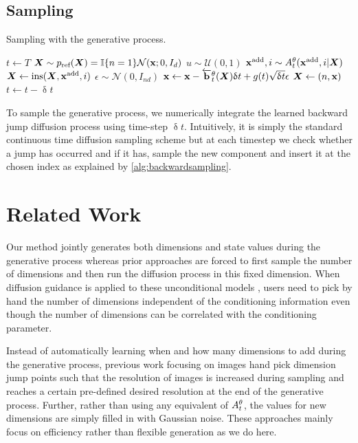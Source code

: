 \subsection{Sampling}

\begin{algorithm}
\caption{Sampling with the generative process.}
\begin{algorithmic}[1] %
\State $t \leftarrow T$
\State ${\bm{X}} \sim p_{\textup{ref}}({\bm{X}}) = \mathbb{I}\{ n=1\} \mathcal{N}({\mathbf{x}}; 0, I_{d})$
    \State $u \sim \mathcal{U}(0, 1)$
        \State ${\mathbf{x}}^{\textup{add}}, i \sim A_{t}^\theta({\mathbf{x}}^{\textup{add}}, i | {\bm{X}})$
        \State ${\bm{X}} \leftarrow \text{ins}({\bm{X}}, {\mathbf{x}}^{\textup{add}}, i)$
    \EndIf
    \State $\epsilon \sim \mathcal{N}(0, I_{nd})$
    \State ${\mathbf{x}} \leftarrow {\mathbf{x}} - \overleftarrow{\mathbf{b}}_{t}^\theta({\bm{X}}) \updelta t + g(t) \sqrt{\updelta t} \epsilon$
    \State ${\bm{X}} \leftarrow (n, {\mathbf{x}})$
    \State $t \leftarrow t - \updelta t$
\EndWhile
\end{algorithmic}
\label{alg:backwardsampling}
\end{algorithm}
To sample the generative process, we numerically integrate the learned backward jump diffusion process using time-step  $\updelta t$. Intuitively, it is simply the standard continuous time diffusion sampling scheme \cite{song2020score} but at each timestep we check whether a jump has occurred and if it has, sample the new component and insert it at the chosen index as explained by \cref{alg:backwardsampling}.


\section{Related Work}

Our method jointly generates both dimensions and state values during the generative process whereas prior approaches \cite{hoogeboom2022equivariant, igashov2022equivariant} are forced to first sample the number of dimensions and then run the diffusion process in this fixed dimension. When diffusion guidance is applied to these unconditional models \cite{weiss2023guided, zhang2023towards}, users need to pick by hand the number of dimensions independent of the conditioning information even though the number of dimensions can be correlated with the conditioning parameter.

Instead of automatically learning when and how many dimensions to add during the generative process, previous work focusing on images \cite{jing2022subspace, zhang2022dimensionality} hand pick dimension jump points such that the resolution of images is increased during sampling and reaches a certain pre-defined desired resolution at the end of the generative process. Further, rather than using any equivalent of $A_t^\theta$, the values for new dimensions are simply filled in with Gaussian noise. These approaches mainly focus on efficiency rather than flexible generation as we do here.


